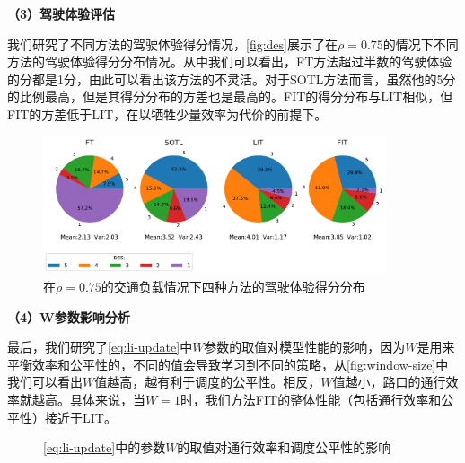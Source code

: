 \textbf{（3）驾驶体验评估}

我们研究了不同方法的驾驶体验得分情况，\autoref{fig:des}展示了在$\rho=0.75$的情况下不同方法的驾驶体验得分分布情况。从中我们可以看出，FT方法超过半数的驾驶体验的分都是1分，由此可以看出该方法的不灵活。对于SOTL方法而言，虽然他的5分的比例最高，但是其得分分布的方差也是最高的。FIT的得分分布与LIT相似，但FIT的方差低于LIT，在以牺牲少量效率为代价的前提下。
\begin{figure}[t]
    \centering
    \includegraphics[width=0.9\textwidth]{fig/des.pdf}
    \caption{在$\rho=0.75$的交通负载情况下四种方法的驾驶体验得分分布}
    \label{fig:des}
\end{figure}

\textbf{（4）W参数影响分析}

最后，我们研究了\autoref{eq:li-update}中$W$参数的取值对模型性能的影响，因为$W$是用来平衡效率和公平性的，不同的值会导致学习到不同的策略，从\autoref{fig:window-size}中我们可以看出$W$值越高，越有利于调度的公平性。相反，$W$值越小，路口的通行效率就越高。具体来说，当$W=1$时，我们方法FIT的整体性能（包括通行效率和公平性）接近于LIT。
\begin{figure}[htb]
    \caption{\autoref{eq:li-update}中的参数$W$的取值对通行效率和调度公平性的影响}
    \label{fig:window-size}
  \end{figure}

